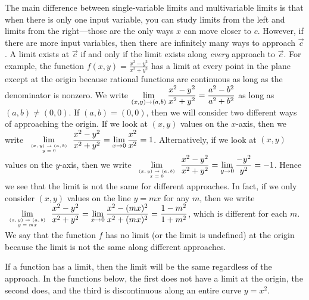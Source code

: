 The main difference between single-variable limits and multivariable
limits is that when there is only one input variable, you can study
limits from the left and limits from the right---those are the only
ways $x$ can move closer to $c$.  However, if there are more input
variables, then there are infinitely many ways to approach $\vec c$. A
limit exists at $\vec c$ if and only if the limit exists along
\emph{every} approach to $\vec c$.  For example, the function $f(x,y)
= \frac{x^2-y^2}{x^2+y^2}$ has a limit at every point in the plane
except at the origin because rational functions are continuous as long
as the denominator is nonzero.  We write $\displaystyle
\lim_{(x,y)\to(a,b)}\frac{x^2-y^2}{x^2+y^2}=\frac{a^2-b^2}{a^2+b^2}$ as
long as $(a,b)\neq(0,0)$.  If $(a,b)=(0,0)$, then we will consider two
different ways of approaching the origin.  If we look at $(x,y)$
values on the $x$-axis, then we write $\displaystyle
\lim_{\text{\tiny$\begin{array}{c} (x,y)\to(a,b)\\y=0
\end{array}$}} 
\frac{x^2-y^2}{x^2+y^2} = \lim_{x\to 0} \frac{x^2}{x^2}=1$.
Alternatively, if we look at $(x,y)$ values on the $y$-axis, then we
write 
$\displaystyle \lim_{\text{\tiny$\begin{array}{c}
 (x,y)\to(a,b)\\x=0
\end{array}$}} \frac{x^2-y^2}{x^2+y^2} = \lim_{y\to 0}
\frac{-y^2}{y^2}=-1$. Hence we see that the limit is not the
same for different approaches.  In fact, if we only consider $(x,y)$
values on the line $y=mx$ for any $m$, then we write 
$\displaystyle \lim_{\text{\tiny$\begin{array}{c}
 (x,y)\to(a,b)\\y=mx
\end{array}$}} \frac{x^2-y^2}{x^2+y^2} = \lim_{x\to 0}
\frac{x^2-(mx)^2}{x^2+(mx)^2}=\frac{1-m^2}{1+m^2}$, which is different
for each $m$. We say that the function $f$ has no limit (or the limit is undefined) at the
origin because the limit is not the same along different approaches. 

If a function has a limit, then the limit will be the same regardless
of the approach. In the functions below, the first does not have a
limit at the origin, the second does, and the third is discontinuous
along an entire curve $y=x^2$.

